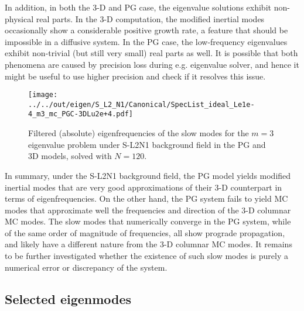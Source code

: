 %
In addition, in both the 3-D and PG case, the eigenvalue solutions exhibit non-physical real parts. In the 3-D computation, the modified inertial modes occasionally show a considerable positive growth rate, a feature that should be impossible in a diffusive system. In the PG case, the low-frequency eigenvalues exhibit non-trivial (but still very small) real parts as well. It is possible that both phenomena are caused by precision loss during e.g. eigenvalue solver, and hence it might be useful to use higher precision and check if it resolves this issue.
%
\begin{figure}[htbp]
    \centering
    \texttt{[image: ../../out/eigen/S\_L2\_N1/Canonical/SpecList\_ideal\_Le1e-4\_m3\_mc\_PGC-3DLu2e+4.pdf]}
    \caption{Filtered (absolute) eigenfrequencies of the slow modes for the $m=3$ eigenvalue problem under S-L2N1 background field in the PG and 3D models, solved with $N=120$.}
    \label{fig:SL2N1-speclist-m3-PGv3D}
\end{figure}

In summary, under the S-L2N1 background field, the PG model yields modified inertial modes that are very good approximations of their 3-D counterpart in terms of eigenfrequencies. On the other hand, the PG system fails to yield MC modes that approximate well the frequencies and direction of the 3-D columnar MC modes. The slow modes that numerically converge in the PG system, while of the same order of magnitude of frequencies, all show prograde propagation, and likely have a different nature from the 3-D columnar MC modes. It remains to be further investigated whether the existence of such slow modes is purely a numerical error or discrepancy of the system.


\subsection{Selected eigenmodes}

